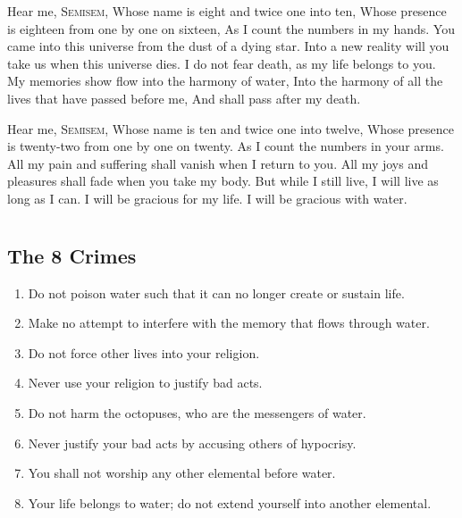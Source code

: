 \documentclass[12pt, letterpaper]{report}
\begin{document}
\begin{poem}
\begin{stanza}
Hear me, S\textsc{emisem},\verseline
Whose name is eight and twice one into ten,\verseline
Whose presence is eighteen from one by one on sixteen,\verseline
As I count the numbers in my hands.\verseline
You came into this universe from the dust of a dying star.\verseline
Into a new reality will you take us when this universe dies.\verseline
I do not fear death, as my life belongs to you.\verseline
My memories show flow into the harmony of water,\verseline
Into the harmony of all the lives that have passed before me,\verseline
And shall pass after my death.
\end{stanza}
\begin{stanza}
Hear me, S\textsc{emisem},\verseline
Whose name is ten and twice one into twelve,\verseline
Whose presence is twenty-two from one by one on twenty.\verseline
As I count the numbers in your arms.\verseline
All my pain and suffering shall vanish when I return to you.\verseline
All my joys and pleasures shall fade when you take my body.\verseline
But while I still live, I will live as long as I can.\verseline
I will be gracious for my life. I will be gracious with water.
\end{stanza}
\end{poem}


\chapter{}

\section{The 8 Crimes}

\begin{enumerate}
  \item Do not poison water such that it can no longer create or sustain life.
  \item Make no attempt to interfere with the memory that flows through water.
  \item Do not force other lives into your religion.
  \item Never use your religion to justify bad acts.
  \item Do not harm the octopuses, who are the messengers of water.
  \item Never justify your bad acts by accusing others of hypocrisy.
  \item You shall not worship any other elemental before water.
  \item Your life belongs to water; do not extend yourself into another elemental.
\end{enumerate}
\end{document}
